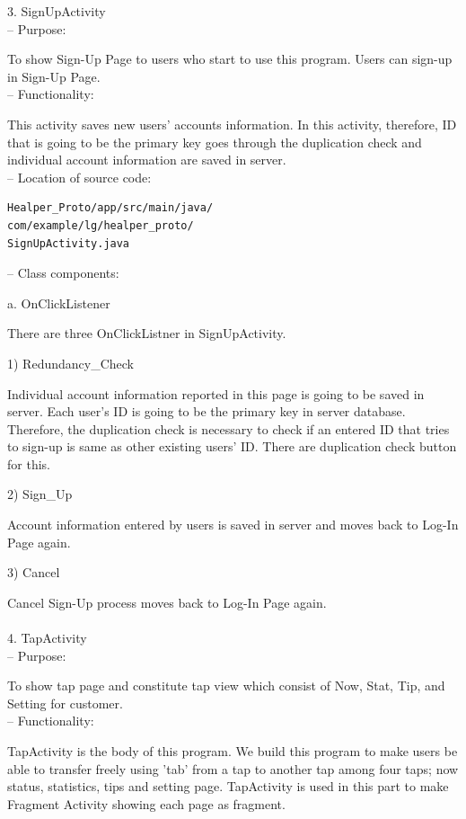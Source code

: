 \documentclass[conference]{IEEEtran}
\begin{document}
3.	SignUpActivity\\

 --	Purpose:

To show Sign-Up Page to users who start to use this program. Users can sign-up in Sign-Up Page. \\

 --	Functionality:

This activity saves new users' accounts information. In this activity, therefore, ID that is going to be the primary key goes through the duplication check and individual account information are saved in server.\\
 
 --	Location of source code:

\begin{verbatim} 
Healper_Proto/app/src/main/java/
com/example/lg/healper_proto/
SignUpActivity.java
 \end{verbatim}
 
 --	Class components:

a. OnClickListener

There are three OnClickListner in SignUpActivity.

  1) Redundancy\_{}Check

  Individual account information reported in this page is going to be saved in server. Each user's ID is going to be the primary key in server database. Therefore, the duplication check is necessary to check if an entered ID that tries to sign-up is same as other existing users' ID. There are duplication check button for this. 

  2) Sign\_{}Up

  Account information entered by users is saved in server and moves back to Log-In Page again.

  3) Cancel

  Cancel Sign-Up process moves back to Log-In Page again.\\\\



4.	TapActivity\\
 
 --	Purpose:
 
To show tap page and constitute tap view which consist of Now, Stat, Tip, and Setting for customer.\\
 
 --	Functionality:

TapActivity is the body of this program. We build this program to make users be able to transfer freely using 'tab' from a tap to another tap among four taps; now status, statistics, tips and setting page. TapActivity is used in this part to make Fragment Activity showing each page as fragment.
\end{document}
